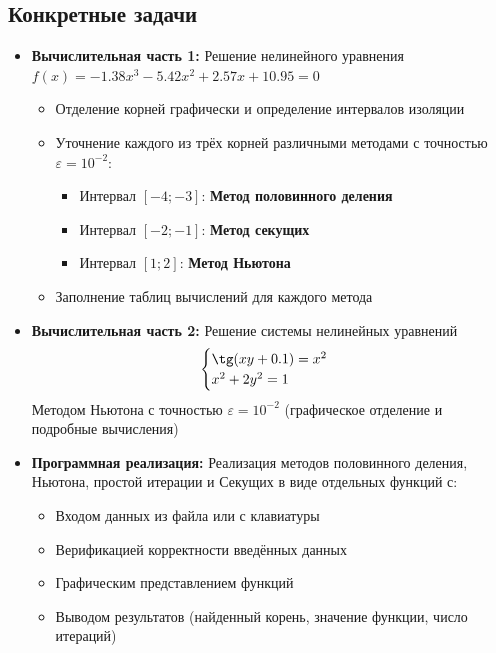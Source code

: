 \documentclass[a4paper,12pt]{article}
\begin{document}
\subsection*{Конкретные задачи}
\begin{itemize}
    \item \textbf{Вычислительная часть 1:} Решение нелинейного уравнения $f(x) = -1.38x^3 - 5.42x^2 + 2.57x + 10.95 = 0$
    \begin{itemize}
        \item Отделение корней графически и определение интервалов изоляции
        \item Уточнение каждого из трёх корней различными методами с точностью $\varepsilon = 10^{-2}$:
        \begin{itemize}
            \item Интервал $[-4; -3]$: \textbf{Метод половинного деления}
            \item Интервал $[-2; -1]$: \textbf{Метод секущих}
            \item Интервал $[1; 2]$: \textbf{Метод Ньютона}
        \end{itemize}
        \item Заполнение таблиц вычислений для каждого метода
    \end{itemize}

    \item \textbf{Вычислительная часть 2:} Решение системы нелинейных уравнений
    \[
    \begin{cases}
    \tg(xy + 0.1) = x^2 \\
    x^2 + 2y^2 = 1
    \end{cases}
    \]
    Методом Ньютона с точностью $\varepsilon = 10^{-2}$ (графическое отделение и подробные вычисления)

    \item \textbf{Программная реализация:} Реализация методов половинного деления, Ньютона, простой итерации и Секущих в виде отдельных функций с:
    \begin{itemize}
        \item Входом данных из файла или с клавиатуры
        \item Верификацией корректности введённых данных
        \item Графическим представлением функций
        \item Выводом результатов (найденный корень, значение функции, число итераций)
    \end{itemize}
\end{itemize}
\end{document}
